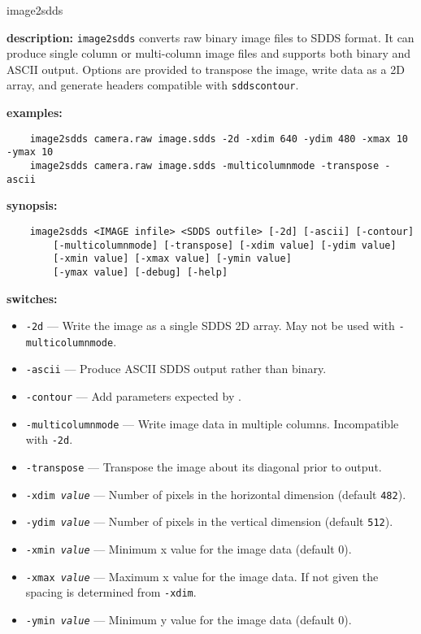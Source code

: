 \begin{sddsprog}{image2sdds}
  \item \textbf{description:} \verb|image2sdds| converts raw binary image files to SDDS format. It can
    produce single column or multi-column image files and supports both
    binary and ASCII output. Options are provided to transpose the image,
    write data as a 2D array, and generate headers compatible with
    \verb|sddscontour|.
  \item \textbf{examples:}
    \begin{verbatim}
    image2sdds camera.raw image.sdds -2d -xdim 640 -ydim 480 -xmax 10 -ymax 10
    image2sdds camera.raw image.sdds -multicolumnmode -transpose -ascii
    \end{verbatim}
  \item \textbf{synopsis:}
    \begin{verbatim}
    image2sdds <IMAGE infile> <SDDS outfile> [-2d] [-ascii] [-contour]
        [-multicolumnmode] [-transpose] [-xdim value] [-ydim value]
        [-xmin value] [-xmax value] [-ymin value]
        [-ymax value] [-debug] [-help]
    \end{verbatim}
  \item \textbf{switches:}
    \begin{itemize}
    \item {\tt -2d} --- Write the image as a single SDDS 2D array. May not be used
      with \verb|-multicolumnmode|.
    \item {\tt -ascii} --- Produce ASCII SDDS output rather than binary.
    \item {\tt -contour} --- Add parameters expected by .
    \item {\tt -multicolumnmode} --- Write image data in multiple columns. Incompatible
      with \verb|-2d|.
    \item {\tt -transpose} --- Transpose the image about its diagonal prior to output.
    \item {\tt -xdim {\em value}} --- Number of pixels in the horizontal dimension
      (default {\tt 482}).
    \item {\tt -ydim {\em value}} --- Number of pixels in the vertical dimension
      (default {\tt 512}).
    \item {\tt -xmin {\em value}} --- Minimum x value for the image data (default 0).
    \item {\tt -xmax {\em value}} --- Maximum x value for the image data. If not given
      the spacing is determined from {\tt -xdim}.
    \item {\tt -ymin {\em value}} --- Minimum y value for the image data (default 0).

\end{itemize}
\end{sddsprog}
